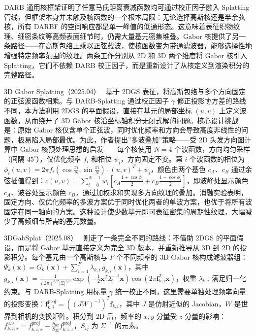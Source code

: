 DARB 通用核框架证明了任意马氏距离衰减函数均可通过校正因子融入 Splatting 管线，但框架本身并未触及核函数的一个根本局限：无论选择高斯核还是半余弦核，所有 DARBF 的空间响应都是单一峰值的低通形态。这意味着表征织物纹理、细密条纹等高频表面细节时，仍需大量基元密集堆叠。Gabor 核提供了另一条路径——在高斯包络上乘以正弦载波，使核函数变为带通滤波器，能够选择性地增强特定频率范围的纹理。两条工作分别从 2D 和 3D 两个维度将 Gabor 核引入 Splatting，它们不依赖 DARB 校正因子，而是重新设计了从核定义到渲染积分的完整路径。

3D Gabor Splatting（2025.04）~\cite{2504_11003} 基于 2DGS 表征，将高斯包络与多个方向固定的正弦波函数相乘。与 DARB-Splatting 通过校正因子 $\gamma$ 修正投影协方差的路线不同，本方法利用 2DGS 的平面假设，直接在基元的局部坐标 $(u,v)$ 上定义波函数，从而绕开了 3D Gabor 核沿坐标轴积分无闭式解的问题。核心设计挑战是：原始 Gabor 核仅含单个正弦波，同时优化频率和方向会导致高度非线性的问题，极易陷入局部最优。为此，作者提出”多波叠加”策略——受 2D 头发方向图计算中 Gabor 核预处理思想的启发——每个核使用 $N=4$ 个波函数，方向均匀采样（间隔 $45^\circ$），仅优化频率 $f_i$ 和相位 $\psi_i$，方向固定不变。第 $i$ 个波函数的相位为 $\phi_i(u,v)=2\pi f_i(\cos\frac{\pi i}{N},\sin\frac{\pi i}{N})\cdot(u,v)^T+\psi_i$，颜色由两个基色 $c_A$、$c_B$ 通过余弦插值得到：$c(u,v)=\sum_{i=0}^{N-1}w_i\!\left[c_A\frac{1+\cos\phi_i}{2}+c_B\frac{1-\cos\phi_i}{2}\right]$，即波峰处显示颜色 $c_A$、波谷处显示颜色 $c_B$，通过加权求和实现多方向纹理的叠加。消融实验表明，固定方向、仅优化频率的多波方案优于同时优化两者的单波方案，也优于将所有波固定在同一轴向的方案。这种设计使少数基元即可表征密集的周期性纹理，大幅减少了高频细节所需的基元数量。

3DGabSplat（2025.08）~\cite{2508_05343} 则走了一条完全不同的路线：不借助 2DGS 的平面假设，而是将 Gabor 基元直接定义为完全 3D 版本，并重新推导从 3D 到 2D 的投影积分。每个基元由一个高斯核与 $F$ 个不同频率的 3D Gabor 核构成滤波器组：$\Psi_k(\mathbf{x})=G_k(\mathbf{x})+\sum_{i=1}^{F}\lambda_{k,i}\,g_{k,i}(\mathbf{x})$，其中 $g_{k,i}(\mathbf{x})=\frac{1}{(2\pi)^{3/2}|\Sigma|^{1/2}}\exp(-\frac{1}{2}\mathbf{x}^T\Sigma^{-1}\mathbf{x})\cos(2\pi\mathbf{f}_{k,i}^T\mathbf{x})$，权重 $\lambda_{k,i}$ 满足归一化约束。与 DARB-Splatting 用标量 $\gamma$ 统一校正不同，这里需要单独处理频率向量的投影变换：$\mathbf{f}_{k,i}^{\text{proj}}=((JW)^{-1})^T\mathbf{f}_{k,i}$，其中 $J$ 是仿射近似的 Jacobian，$W$ 是世界到相机的变换矩阵。积分到 2D 后，频率的 $x,y$ 分量受 $z$ 分量的影响：$f_{k,i,x}^{2D}=f_{k,i,x}^{\text{proj}}-\frac{S_{02}}{S_{22}}f_{k,i,z}^{\text{proj}}$，$S_{ij}$ 为 $\Sigma^{-1}$ 的元素。

